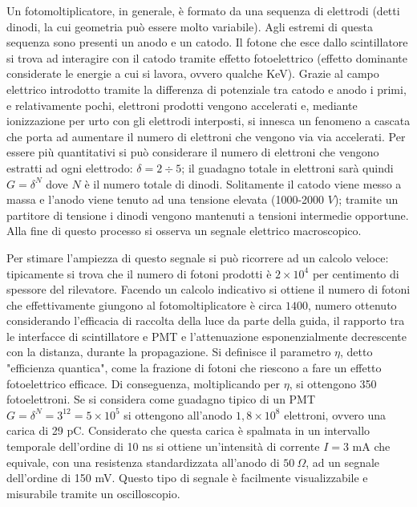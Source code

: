 \documentclass[a4paper,10pt]{article}
\begin{document}
Un fotomoltiplicatore, in generale, è formato da una sequenza di elettrodi (detti dinodi, la cui geometria può essere molto variabile). Agli estremi di questa sequenza sono presenti un anodo e un catodo. Il fotone che esce dallo scintillatore si trova ad interagire con il catodo tramite effetto fotoelettrico (effetto dominante considerate le energie a cui si lavora, ovvero qualche KeV). Grazie al campo elettrico introdotto tramite la differenza di potenziale tra catodo e anodo i primi, e relativamente pochi, elettroni prodotti vengono accelerati e, mediante ionizzazione per urto con gli elettrodi interposti, si innesca un fenomeno a cascata che porta ad aumentare il numero di elettroni che vengono via via accelerati. Per essere più quantitativi si può considerare il numero di elettroni che vengono estratti ad ogni elettrodo: $\delta=2\div 5$; il guadagno totale in elettroni sarà quindi $G=\delta ^N$ dove $N$ è il numero totale di dinodi. Solitamente il catodo viene messo a massa e l'anodo viene tenuto ad una tensione elevata (1000-2000 $V$); tramite un partitore di tensione i dinodi vengono mantenuti a tensioni intermedie opportune. Alla fine di questo processo si osserva un segnale elettrico macroscopico.

Per stimare l'ampiezza di questo segnale si può ricorrere ad un calcolo veloce: tipicamente si trova che il numero di fotoni prodotti è $2\times 10^{4}$ per centimento di spessore del rilevatore. Facendo un calcolo indicativo si ottiene il numero di fotoni che effettivamente giungono al fotomoltiplicatore è circa $1400$, numero ottenuto considerando l'efficacia di raccolta della luce da parte della guida, il rapporto tra le interfacce di scintillatore e PMT e l'attenuazione esponenzialmente decrescente con la distanza, durante la propagazione. Si definisce il parametro $\eta$, detto "efficienza quantica", come la frazione di fotoni che riescono a fare un effetto fotoelettrico efficace. Di conseguenza, moltiplicando per $\eta$, si ottengono 350 fotoelettroni. Se si considera come guadagno tipico di un PMT $G=\delta ^N=3^{12}=5 \times 10^5$ si ottengono all'anodo $1,8 \times 10^8$ elettroni, ovvero una carica di 29 pC. Considerato che questa carica è spalmata in un intervallo temporale dell'ordine di 10 ns si ottiene un'intensità di corrente $I=3$ mA che equivale, con una resistenza standardizzata all'anodo di $50\ \Omega$, ad un segnale dell'ordine di 150 mV. Questo tipo di segnale è facilmente visualizzabile e misurabile tramite un oscilloscopio.
\end{document}
